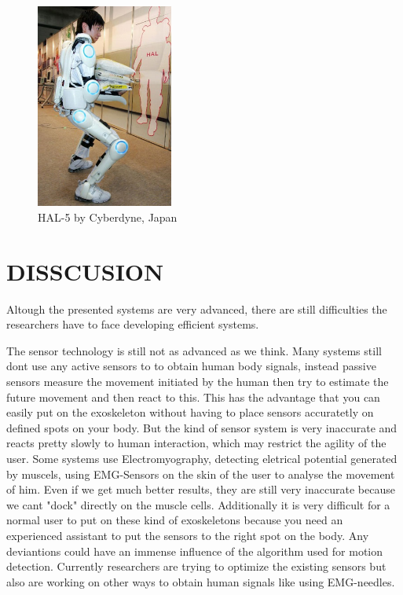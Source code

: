 \documentclass[letterpaper, 10 pt, conference]{ieeeconf}  %
\begin{document}
\begin{figure}[H]
  \centering
    \includegraphics[width=0.4\textwidth]{img/hal}
  \caption{HAL-5 by Cyberdyne, Japan}
\end{figure}


\section{DISSCUSION}

Altough the presented systems are very advanced, there are still difficulties the researchers have to face developing efficient systems. 


The sensor technology is still not as advanced as we think. Many systems still dont use any active sensors to to obtain human body signals, instead passive sensors measure the movement initiated by the human then try to estimate the future movement and then react to this. This has the advantage that you can easily put on the exoskeleton without having to place sensors accuratetly on defined spots on your body. But the kind of sensor system is very inaccurate and reacts pretty slowly to human interaction, which may restrict the agility of the user. Some systems use Electromyography, detecting eletrical potential generated by muscels, using EMG-Sensors on the skin of the user to analyse the movement of him. Even if we get much better results, they are still very inaccurate because we cant "dock" directly on the muscle cells. Additionally it is very difficult for a normal user to put on these kind of exoskeletons because you need an experienced assistant to put the sensors to the right spot on the body. Any deviantions could have an immense influence of the algorithm used for motion detection. Currently researchers are trying to optimize the existing sensors but also are working on other ways to obtain human signals like using EMG-needles.
\end{document}
